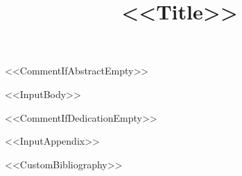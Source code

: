 \documentclass[%
SecEq,
CM,
GP,
<<DocumentClassOptions>>]{degruyter-crelle}
\title[<<ShortTitle>>]{<<Title>>}
\begin{document}
<<CommentIfAbstractEmpty>>

<<InputBody>>

<<CommentIfDedicationEmpty>>

\appendix
<<InputAppendix>>

<<CustomBibliography>>
\end{document}
